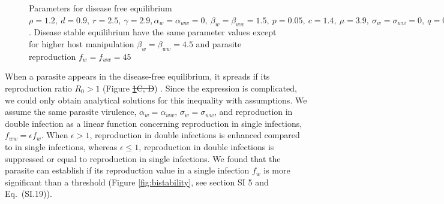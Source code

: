 \documentclass[a4paper]{scrartcl}
\providecommand{\DIFaddtex}[1]{{\protect\color{blue}\uwave{#1}}} %
\providecommand{\DIFdeltex}[1]{{\protect\color{red}\sout{#1}}}                      %
\providecommand{\DIFaddbegin}{} %
\providecommand{\DIFaddend}{} %
\providecommand{\DIFdelbegin}{} %
\providecommand{\DIFdelend}{} %
\providecommand{\DIFaddendFL}{} %
\providecommand{\DIFadd}[1]{\texorpdfstring{\DIFaddtex{#1}}{#1}} %
\providecommand{\DIFdel}[1]{\texorpdfstring{\DIFdeltex{#1}}{}} %
\newcommand{\DIFscaledelfig}{0.5}
\newlength{\DIFdelgraphicswidth} %
\newlength{\DIFdelgraphicsheight} %
\newcommand{\DIFaddincludegraphics}[2][]{{\color{blue}\fbox{\DIFOincludegraphics[#1]{#2}}}} %
\newcommand{\DIFdelincludegraphics}[2][]{%
\sbox{\DIFdelgraphicsbox}{\DIFOincludegraphics[#1]{#2}}%
\settoboxwidth{\DIFdelgraphicswidth}{\DIFdelgraphicsbox} %
\settoboxtotalheight{\DIFdelgraphicsheight}{\DIFdelgraphicsbox} %
\scalebox{\DIFscaledelfig}{%
\parbox[b]{\DIFdelgraphicswidth}{\usebox{\DIFdelgraphicsbox}\\[-\baselineskip] \rule{\DIFdelgraphicswidth}{0em}}\llap{\resizebox{\DIFdelgraphicswidth}{\DIFdelgraphicsheight}{%
\setlength{\unitlength}{\DIFdelgraphicswidth}%
\begin{picture}(1,1)%
\thicklines\linethickness{2pt} %
{\color[rgb]{1,0,0}\put(0,0){\framebox(1,1){}}}%
{\color[rgb]{1,0,0}\put(0,0){\line( 1,1){1}}}%
{\color[rgb]{1,0,0}\put(0,1){\line(1,-1){1}}}%
\end{picture}%
}\hspace*{3pt}}} %
} %
\DeclareRobustCommand{\DIFaddbegin}{\DIFOaddbegin \let\includegraphics\DIFaddincludegraphics} %
\DeclareRobustCommand{\DIFaddend}{\DIFOaddend \let\includegraphics\DIFOincludegraphics} %
\DeclareRobustCommand{\DIFdelbegin}{\DIFOdelbegin \let\includegraphics\DIFdelincludegraphics} %
\DeclareRobustCommand{\DIFdelend}{\DIFOaddend \let\includegraphics\DIFOincludegraphics} %
\DeclareRobustCommand{\DIFaddendFL}{\DIFOaddendFL \let\includegraphics\DIFOincludegraphics} %
\begin{document}
\begin{figure}[!ht]
{{}\DIFaddendFL Parameters for disease free equilibrium $\rho =  1.2, \ d = 0.9, \  r = 2.5, \ \gamma =  2.9, \alpha_w = \alpha_{ww} =  0, \ \beta_w = \beta_{ww} = 1.5, \ p = 0.05, \  c = 1.4, \ \mu = 3.9, \ \sigma_w = \sigma_{ww} = 0, \ q = 0.05, \ f_w = f_{ww} = 7.5, \ \delta = 0.9, \ k = 0.26, \ h = 0.6$. Disease stable equilibrium have the same parameter values except for higher host manipulation $ \beta_w =  \beta_{ww} = 4.5$ and parasite reproduction $ f_w  = f_{ww} = 45$}
\label{fig:ecotraject:nonlinear}
\end{figure}

When a parasite appears in the disease-free equilibrium, it spreads if its reproduction ratio $R_0 > 1$ (Figure \DIFdelbegin \DIFdel{\ref{fig:ecotraject:nonlinear}C, D}\DIFdelend \DIFaddbegin \DIFadd{\ref{fig:R0}}\DIFaddend ) . 
Since the expression is complicated, we could only obtain analytical solutions for this inequality with assumptions. 
We assume the same parasite virulence, $\alpha_w = \alpha_{ww}$, $\sigma_w = \sigma_{ww}$, and reproduction in double infection as a linear function concerning reproduction in single infections, $f_{ww} = \epsilon f_w$. 
When $\epsilon > 1$, reproduction in double infections is enhanced compared to in single infections, whereas $\epsilon \leq 1$, reproduction in double infections is suppressed or equal to reproduction in single infections.
We found that the parasite can establish if its reproduction value in a single infection $f_w$ is more significant than a threshold (Figure \ref{fig:bistability}, see section SI 5 and Eq.~(SI.19)). 
\end{document}
